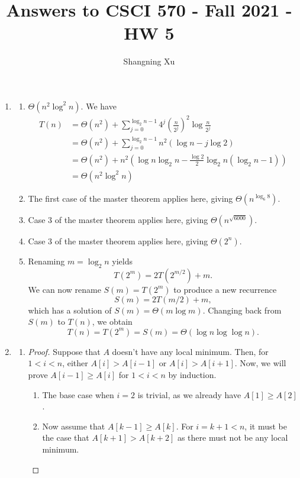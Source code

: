 \documentclass{article}
\title{Answers to CSCI 570 - Fall 2021 - HW 5}
\author{Shangning Xu}
\begin{document}
\maketitle

\begin{enumerate}
    \item   
    \begin{enumerate}[label=\alph*)]
        \item $\Theta(n^2\log^2 n)$. We have
        \begin{align*}
            T(n) &= \Theta(n^2) + \sum_{j = 0}^{\log_2 n - 1} 4^j\left(\frac{n}{2^j}\right)^2 \log\frac{n}{2^j}\\
            &= \Theta(n^2) + \sum_{j = 0}^{\log_2 n - 1} n^2 (\log n - j\log 2)\\
            &= \Theta(n^2) + n^2(\log n\log_2 n - \frac{\log 2}{2}\log_2 n(\log_2 n - 1))\\
            &= \Theta(n^2\log^2 n)
        \end{align*}
        \item The first case of the master theorem applies here, giving $\Theta(n^{\log_6 8})$.
        \item Case 3 of the master theorem applies here, giving $\Theta(n^{\sqrt{6000}})$.
        \item Case 3 of the master theorem applies here, giving $\Theta(2^n)$.
        \item Renaming $m = \log_2 n$ yields
        \[
            T(2^m) = 2T(2^{m/2}) + m.
        \]
        We can now rename $S(m) = T(2^m)$ to produce a new recurrence
        \[
            S(m) = 2T(m/2) + m,
        \]
        which has a solution of $S(m) = \Theta(m\log m)$. Changing back from $S(m)$ to $T(n)$, we obtain
        \[
            T(n) = T(2^m) = S(m) = \Theta(\log n\log\log n).
        \]
    \end{enumerate}

    \item
    \begin{enumerate}
        \item
        \begin{proof}
            Suppose that $A$ doesn't have any local minimum. Then, for $1 < i < n$, either $A[i] > A[i - 1]$ or $A[i] > A[i + 1]$. Now, we will prove $A[i - 1] \ge A[i]$ for $1 < i < n$ by induction.

            \begin{enumerate}
                \item The base case when $i = 2$ is trivial, as we already have $A[1] \ge A[2]$.
                \item Now assume that $A[k - 1] \ge A[k]$. For $i = k + 1 < n$, it must be the case that $A[k + 1] > A[k + 2]$ as there must not be any local minimum.
            \end{enumerate}


\end{proof}
\end{enumerate}
\end{enumerate}
\end{document}
